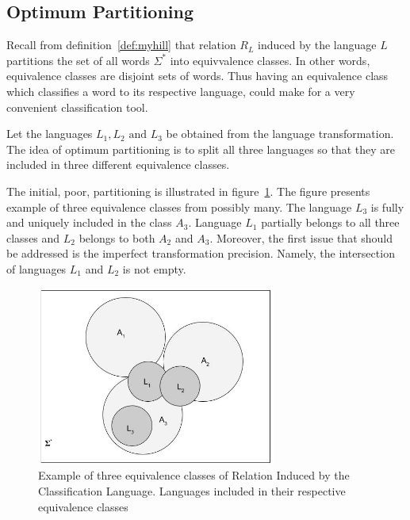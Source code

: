 \documentclass{mini}
\begin{document}
\subsection{Optimum Partitioning}\label{sec:lan_theory_class_lan_opt_part}

Recall from definition~\ref{def:myhill} that relation $R_L$ induced by the language $L$ partitions the set of all words $\Sigma^{*}$ into equivvalence classes. In other words, equivalence classes are disjoint sets of words. Thus having an equivalence class which classifies a word to its respective language, could make for a very convenient classification tool.

Let the languages $L_{1}, L_{2} \text{ and } L_{3}$ be obtained from the language transformation. The idea of optimum partitioning is to split all three languages so that they are included in three different equivalence classes. 

The initial, poor, partitioning is illustrated in figure~\ref{fig:eq_classes_small_precision}. The figure presents example of three equivalence classes from possibly many. The language $L_{3}$ is fully and uniquely included in the class $A_{3}$. Language $L_{1}$ partially belongs to all three classes and $L_{2}$ belongs to both $A_{2}$ and $A_{3}$. Moreover, the first issue that should be addressed is the imperfect transformation precision. Namely, the intersection of languages $L_{1}$ and $L_{2}$ is not empty.

\begin{figure}[H]
    \centering
    \includegraphics[width=0.7\textwidth]{./images/equivalence_classes_small_pt.jpg}
    \caption{Example of three equivalence classes of Relation Induced by the Classification Language. Languages included in their respective equivalence classes}
    \label{fig:eq_classes_small_precision}
\end{figure}
\end{document}
